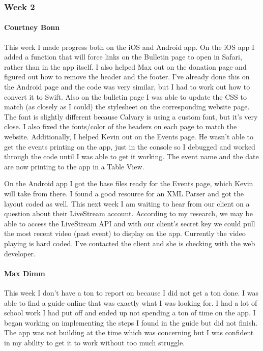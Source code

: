 		\subsubsection{Week 2}

			\paragraph{Courtney Bonn}
			This week I made progress both on the iOS and Android app. On the iOS app I added a function that will force links on the Bulletin page to open in Safari, rather than in the app itself. I also helped Max out on the donation page and figured out how to remove the header and the footer. I've already done this on the Android page and the code was very similar, but I had to work out how to convert it to Swift. Also on the bulletin page I was able to update the CSS to match (as closely as I could) the stylesheet on the corresponding website page. The font is slightly different because Calvary is using a custom font, but it's very close. I also fixed the fonts/color of the headers on each page to match the website. Additionally, I helped Kevin out on the Events page. He wasn't able to get the events printing on the app, just in the console so I debugged and worked through the code until I was able to get it working. The event name and the date are now printing to the app in a Table View.

On the Android app I got the base files ready for the Events page, which Kevin will take from there. I found a good resource for an XML Parser and got the layout coded as well. This next week I am waiting to hear from our client on a question about their LiveStream account. According to my research, we may be able to access the LiveStream API and with our client's secret key we could pull the most recent video (past event) to display on the app. Currently the video playing is hard coded. I've contacted the client and she is checking with the web developer.

			\paragraph{Max Dimm}
			This week I don't have a ton to report on because I did not get a ton done. I was able to find a guide online that was exactly what I was looking for. I had a lot of school work I had put off and ended up not spending a ton of time on the app. I began working on implementing the steps I found in the guide but did not finish. The app was not building at the time which was concerning but I was confident in my ability to get it to work without too much struggle.

